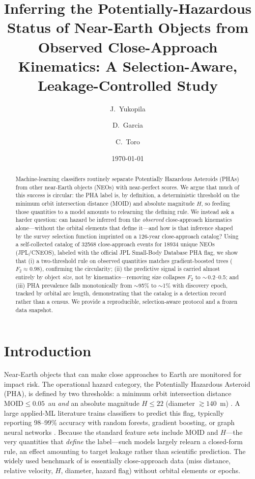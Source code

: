 \documentclass[11pt]{article}
\title{Inferring the Potentially-Hazardous Status of Near-Earth Objects from
Observed Close-Approach Kinematics: A Selection-Aware, Leakage-Controlled Study}
\author{J.\ Yukopila \and D.\ Garcia \and C.\ Toro}
\date{\today}
\begin{document}
\maketitle

\begin{abstract}
Machine-learning classifiers routinely separate Potentially Hazardous Asteroids
(PHAs) from other near-Earth objects (NEOs) with near-perfect scores. We argue that
much of this success is circular: the PHA label is, by definition, a deterministic
threshold on the minimum orbit intersection distance (MOID) and absolute magnitude
$H$, so feeding those quantities to a model amounts to relearning the defining rule.
We instead ask a harder question: can hazard be inferred from the \emph{observed}
close-approach kinematics alone---without the orbital elements that define it---and
how is that inference shaped by the survey selection function imprinted on a
126-year close-approach catalog? Using a self-collected catalog of
\num{32568} close-approach events for \num{18934} unique NEOs (JPL/CNEOS), labeled
with the official JPL Small-Body Database PHA flag, we show that (i) a two-threshold
rule on observed quantities matches gradient-boosted trees ($F_2\approx0.98$),
confirming the circularity; (ii) the predictive signal is carried almost entirely by
object \emph{size}, not by kinematics---removing size collapses $F_2$ to
$\sim$\,0.2--0.5; and (iii) PHA prevalence falls monotonically from $\sim$95\% to
$\sim$1\% with discovery epoch, tracked by orbital arc length, demonstrating that the
catalog is a detection record rather than a census. We provide a reproducible,
selection-aware protocol and a frozen data snapshot.
\end{abstract}

\section{Introduction}
Near-Earth objects that can make close approaches to Earth are monitored for impact
risk. The operational hazard category, the Potentially Hazardous Asteroid (PHA), is
defined by two thresholds: a minimum orbit intersection distance $\mathrm{MOID}\le
0.05$~au \emph{and} an absolute magnitude $H\le 22$ (diameter $\gtrsim 140$~m)
\citep{cneos_pha}. A large applied-ML literature trains classifiers to predict this
flag, typically reporting 98--99\% accuracy with random forests, gradient boosting,
or graph neural networks \citep{neo_resampling2025,neo_gnn2025,neo_xai2025}. Because
the standard feature sets include MOID and $H$---the very quantities that
\emph{define} the label---such models largely relearn a closed-form rule, an effect
amounting to target leakage rather than scientific prediction. The widely used
benchmark of \citet{kaggle_neo} is essentially close-approach data (miss distance,
relative velocity, $H$, diameter, hazard flag) without orbital elements or epochs.
\end{document}

